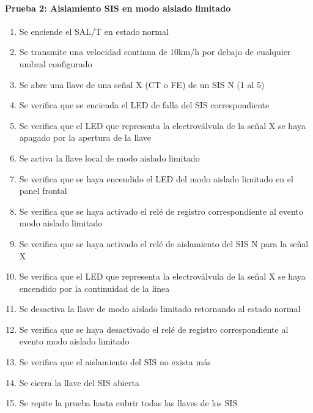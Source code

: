 \paragraph{Prueba 2: Aislamiento SIS en modo aislado limitado}
\begin{enumerate}
\item	Se enciende el SAL/T en estado normal
\item	Se transmite una velocidad continua de 10km/h por debajo de cualquier umbral configurado
\item	Se abre una llave de una señal X (CT o FE) de un SIS N (1 al 5)
\item	Se verifica que se encienda el LED de falla del SIS correspondiente
\item	Se verifica que el LED que representa la electroválvula de la señal X se haya apagado por la apertura de la llave
\item	Se activa la llave local de modo aislado limitado
\item	Se verifica que se haya encendido el LED del modo aislado limitado en el panel frontal
\item	Se verifica que se haya activado el relé de registro correspondiente al evento modo aislado limitado 
\item	Se verifica que se haya activado el relé de aislamiento del SIS N para la señal X
\item	Se verifica que el LED que representa la electroválvula de la señal X se haya encendido por la continuidad de la línea
\item	Se desactiva la llave de modo aislado limitado retornando al estado normal
\item	Se verifica que se haya desactivado el relé de registro correspondiente al evento modo aislado limitado 
\item	Se verifica que el aislamiento del SIS no exista más
\item	Se cierra la llave del SIS abierta
\item	Se repite la prueba hasta cubrir todas las llaves de los SIS

\end{enumerate}

